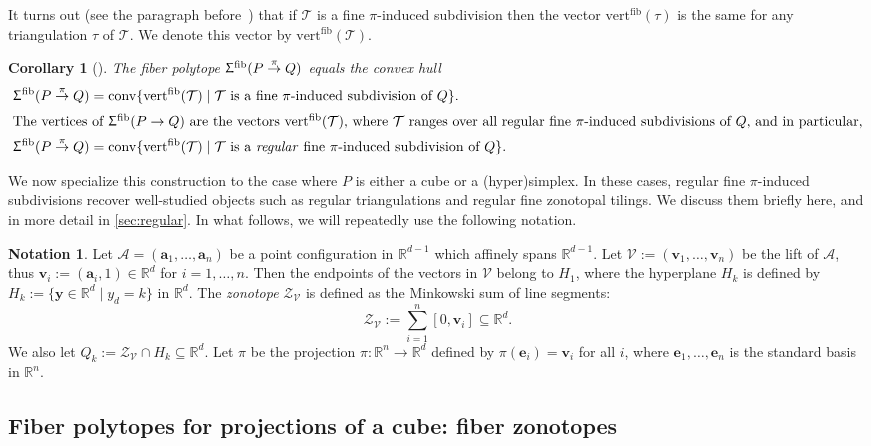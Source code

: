\documentclass[11pt]{amsart}
\theoremstyle{plain}
\newtheorem{corollary}[theorem]{Corollary}
\theoremstyle{definition}
\newtheorem{notation}[theorem]{Notation}
\def\R{\mathbb{R}}
\def\v{{\bm{v}}}
\def\y{{\bm{y}}}
\def\A{\mathcal{A}}
\def\V{\mathcal{V}}
\def\e{{\bm{e}}}
\def\a{{\bm{a}}}
\def\conv{\mathrm{conv}}
\def\Tr{\tau}
\def\Zon{\mathcal{Z}}
\def\ZV{\Zon_\V}
\def\vert{\mathrm{vert}}
\def\vertFib{\vert^\fiber}
\def\fiber{{\operatorname{fib}}}
\def\FibPoly{\Upsigma^\fiber}
\def\pito{\overset \pi \to}
\def\VC{\V}
\def\Tcal{\mathcal{T}}
\def\Tiling{\Tcal}
\let\subset\subseteq
\begin{document}
It turns out (see the paragraph before~\cite[Corollary~2.7]{BS}) that if $\Tiling$ is a fine $\pi$-induced subdivision then the vector $\vertFib(\Tr)$ is the same for any triangulation $\Tr$ of $\Tiling$. We denote this vector by $\vertFib(\Tiling)$.
\begin{corollary}[{\cite[Corollary~2.7]{BS}}]\label{cor:BS_tiling}
The fiber polytope $\FibPoly(P\pito Q)$ equals the convex hull
\begin{align}
\label{eq:BS_tiling}
 \FibPoly(P\pito Q)&=\conv\{\vertFib(\Tiling)\mid \Tiling\text{ is a fine $\pi$-induced subdivision of $Q$}\}.\\
\intertext{The vertices of $\FibPoly(P\to Q)$ are the vectors $\vertFib(\Tiling)$, where $\Tiling$ ranges over all regular fine $\pi$-induced subdivisions of $Q$, and in particular,}
\label{eq:BS_tiling_reg}
 \FibPoly(P\pito Q)&=\conv\{\vertFib(\Tiling)\mid \Tiling\text{ is a \emph{regular} fine $\pi$-induced subdivision of $Q$}\}.
\end{align}
\end{corollary}




We now specialize this construction to the case where $P$ is either a cube or a (hyper)simplex. In these cases, regular fine $\pi$-induced subdivisions recover well-studied objects such as regular triangulations and regular fine zonotopal tilings. We discuss them briefly here, and 
in more detail in \cref{sec:regular}.
In what follows, we will repeatedly use  the following notation.
\def\Hyp{H}

\begin{notation}\label{notation}
Let $\A = (\a_1,\dots,\a_n)$ be
a point configuration in $\R^{d-1}$ which affinely spans $\R^{d-1}$. 
Let $\VC:=(\v_1,\dots,\v_n)$ be the lift of $\A$, thus $\v_i:=(\a_i,1)\in\R^d$ 
for $i=1,\dots, n$.  
Then the endpoints of the vectors in $\VC$ belong to $\Hyp_1$,  
where 
the hyperplane $\Hyp_k$ is defined by $\Hyp_k:=\{\y\in\R^d\mid y_d=k\}$ in 
$\R^d$. 
The \emph{zonotope} $\Zon_\V$ is defined as the Minkowski sum of line segments:
$$
\Zon_\V:=\sum_{i=1}^n [0,\v_i] \subset \R^d.
$$
We also let $Q_k:=\ZV\cap \Hyp_k\subset \R^d$.
Let $\pi$ be the projection $\pi: \R^n \to \R^d$ defined by 
 $\pi(\e_i) = \v_i$ for all $i$, where 
 $\e_1,\dots,\e_n$ is the standard basis in $\R^n$. 
\end{notation}


\subsection{Fiber polytopes for projections of a cube: fiber zonotopes}
\label{sec:zonotopal_tilings}
\end{document}
